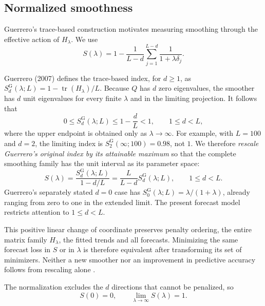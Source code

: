 \subsection{Normalized smoothness}

Guerrero's trace-based construction motivates measuring smoothing through the effective action of $H_\lambda$. We use
\begin{equation}
\label{eq:S}
S(\lambda)
=
1-
\frac{1}{L-d}
\sum_{j=1}^{L-d}
\frac{1}{1+\lambda\delta_j}.
\end{equation}

Guerrero (2007) defines the trace-based index, for $d\ge1$,
as $S^{\mathrm{G}}_d(\lambda;L)=1-\operatorname{tr}(H_\lambda)/L$.
Because $Q$ has $d$ zero eigenvalues, the smoother has $d$ unit
eigenvalues for every finite $\lambda$ and in the limiting
projection. It follows that
\begin{equation}
\label{eq:guerrero_attainable_range}
0\le S^{\mathrm{G}}_d(\lambda;L)\le1-\frac{d}{L}<1,
\qquad 1\le d<L,
\end{equation}
where the upper endpoint is obtained only as $\lambda\to\infty$.
For example, with $L=100$ and $d=2$, the limiting index is
$S^{\mathrm{G}}_2(\infty;100)=0.98$, not $1$.
We therefore \emph{rescale Guerrero's original index by its attainable
maximum} so that the complete smoothing family has the unit interval
as its parameter space:
\begin{equation}
\label{eq:smoothness_index_rescaling}
\boxed{
S(\lambda)=
\frac{S^{\mathrm{G}}_d(\lambda;L)}{1-d/L}
=\frac{L}{L-d}S^{\mathrm{G}}_d(\lambda;L),
\qquad 1\le d<L.}
\end{equation}
Guerrero's separately stated $d=0$ case has
$S^{\mathrm{G}}_0(\lambda;L)=\lambda/(1+\lambda)$,
already ranging from zero to one in the extended limit. The present
forecast model restricts attention to $1\le d<L$.

This positive linear change of coordinate preserves penalty ordering,
the entire matrix family $H_\lambda$, the fitted trends and all forecasts.
Minimizing the same forecast loss in $S$ or in $\lambda$ is therefore
equivalent after transforming its set of minimizers. Neither a new
smoother nor an improvement in predictive accuracy follows from
rescaling alone \cite{guerrero2007penalized,cortes2017smoothness}.

The normalization excludes the $d$ directions that cannot be penalized, so
\begin{equation}
\label{eq:smoothness_endpoints}
S(0)=0,
\qquad
\lim_{\lambda\to\infty}S(\lambda)=1.
\end{equation}

